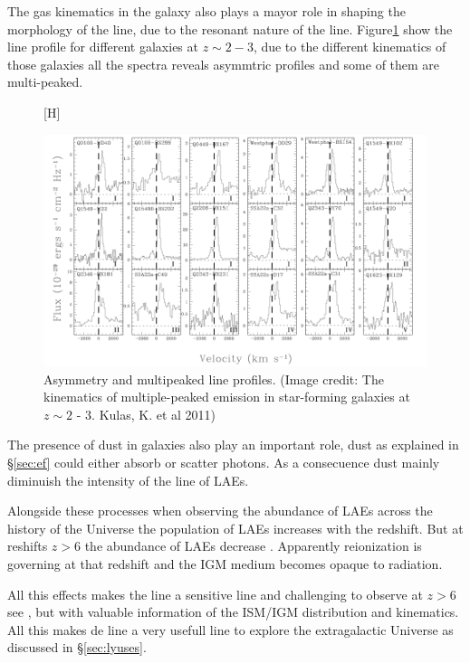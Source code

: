 The gas kinematics in the galaxy also plays a mayor role in shaping
the morphology of the line, due to the resonant nature of the line. 
Figure\ref{fig:kulas} show the \ly line
profile for different galaxies at $z \sim 2 - 3$, due to the different
kinematics of those galaxies all the spectra reveals asymmtric profiles 
and some of them are multi-peaked.    


\begin{figure}\label{fig:kulas}[H]
\begin{center}
\includegraphics[scale=0.4]{../Figures/kulas.png}
\end{center}\caption{Asymmetry and multipeaked \ly line profiles. (Image credit: The kinematics of multiple-peaked \ly emission in star-forming galaxies at $z\sim 2$ - 3. Kulas, K. et al 2011) }
\end{figure}

The presence of dust in galaxies also play an important role, dust as explained
 in \S\ref{sec:ef} could either absorb or scatter \ly photons. As a 
consecuence dust mainly diminuish the intensity of the \ly line of LAEs. 

Alongside these processes when observing the abundance of LAEs across
the history of the Universe the population of LAEs increases 
with the redshift. But at reshifts $z>6$ the  
abundance of LAEs decrease \citep{Schenker12}. Apparently 
 reionization  is governing at that redshift and the IGM medium 
becomes opaque to \ly radiation.   

All this effects makes the \ly line a sensitive line and challenging
to observe at $z>6$ see \citep{Sobral15}, but with valuable information
of the ISM/IGM distribution and kinematics. All this makes de \ly
line a very usefull line to explore the extragalactic Universe as
discussed in \S\ref{sec:lyuses}.

